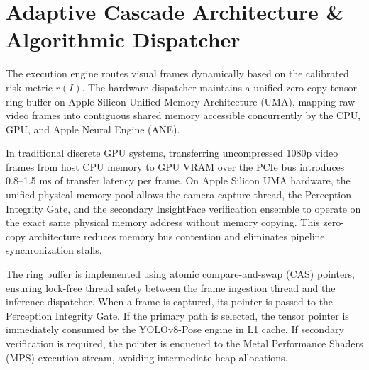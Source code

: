 \documentclass[conference]{IEEEtran}
\begin{document}
\section{Adaptive Cascade Architecture & Algorithmic Dispatcher}
The execution engine routes visual frames dynamically based on the calibrated risk metric $r(I)$. The hardware dispatcher maintains a unified zero-copy tensor ring buffer on Apple Silicon Unified Memory Architecture (UMA), mapping raw video frames into contiguous shared memory accessible concurrently by the CPU, GPU, and Apple Neural Engine (ANE).

In traditional discrete GPU systems, transferring uncompressed 1080p video frames from host CPU memory to GPU VRAM over the PCIe bus introduces 0.8--1.5 ms of transfer latency per frame. On Apple Silicon UMA hardware, the unified physical memory pool allows the camera capture thread, the Perception Integrity Gate, and the secondary InsightFace verification ensemble to operate on the exact same physical memory address without memory copying. This zero-copy architecture reduces memory bus contention and eliminates pipeline synchronization stalls.

The ring buffer is implemented using atomic compare-and-swap (CAS) pointers, ensuring lock-free thread safety between the frame ingestion thread and the inference dispatcher. When a frame is captured, its pointer is passed to the Perception Integrity Gate. If the primary path is selected, the tensor pointer is immediately consumed by the YOLOv8-Pose engine in L1 cache. If secondary verification is required, the pointer is enqueued to the Metal Performance Shaders (MPS) execution stream, avoiding intermediate heap allocations.
\end{document}
